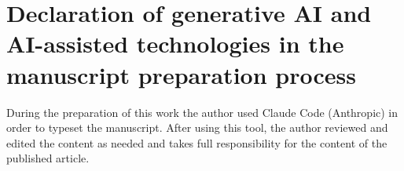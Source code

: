 \section*{Declaration of generative AI and AI-assisted technologies in the manuscript preparation process}
During the preparation of this work the author used Claude Code (Anthropic) in order to typeset the manuscript.
After using this tool, the author reviewed and edited the content as needed and takes full responsibility for the content of the published article.
